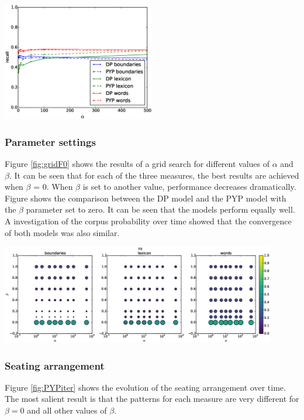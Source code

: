 \begingroup
    \centering
    \includegraphics[width=0.5\textwidth]{images/DP-vs-PYP-recall}
    \label{fig:PYPvsDP}
\endgroup

\subsubsection{Parameter settings}
Figure \ref{fig:gridF0} shows the results of a grid search for different values of $\alpha$ and $\beta$. It can be seen that for each of the three measures, the best results are achieved when $\beta$ = 0. When $\beta$ is set to another value, performance decreases dramatically. 
Figure  shows the comparison between the DP model and the PYP model with the $\beta$ parameter set to zero. It can be seen that the models perform equally well. A investigation of the corpus probability over time showed that the convergence of both models was also similar.

\begingroup
    \centering
    \includegraphics[width=0.9\textwidth]{images/PYP-F0}
    \label{fig:gridF0}
\endgroup

\subsubsection{Seating arrangement}
Figure \ref{fig:PYPiter} shows the evolution of the seating arrangement over time. 
The most salient result is that the patterns for each measure are very different for $\beta=0$ and all other values of $\beta$. 

